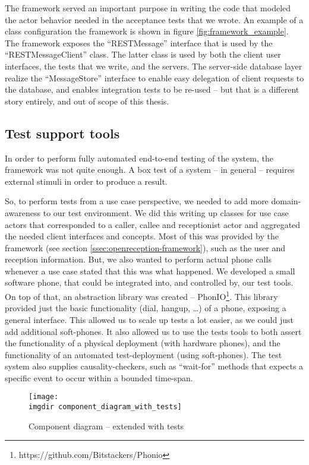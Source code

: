 \noindent The framework served an important purpose in writing the code that modeled the actor behavior needed in the acceptance tests that we wrote. An example of a class configuration the framework is shown in figure \ref{fig:framework_example}. The framework exposes the ``RESTMessage'' interface that is used by the ``RESTMessageClient'' class. The latter class is used by both the client user interfaces, the tests that we write, and the servers. The server-side database layer realize the ``MessageStore'' interface to enable easy delegation of client requests to the database, and enables integration tests to be re-used -- but that is a different story entirely, and out of scope of this thesis.

\subsection{Test support tools}
\label{ssec:supporting-test-tools}
In order to perform fully automated end-to-end testing of the system, the framework was not quite enough. A box test of a system -- in general -- requires external stimuli in order to produce a result.\medskip

\noindent So, to perform tests from a use case perspective, we needed to add more domain-awareness to our test environment. We did this writing up classes for use case actors that corresponded to a caller, callee and receptionist actor and aggregated the needed client interfaces and concepts. Most of this was provided by the framework (see section \ref{ssec:openreception-framework}), such as the user and reception information. But, we also wanted to perform actual phone calls whenever a use case stated that this was what happened. We developed a small software phone, that could be integrated into, and controlled by, our test tools. On top of that, an abstraction library was created -- PhonIO\footnote{https://github.com/Bitstackers/Phonio}. This library provided just the basic functionality (dial, hangup, \dots) of a phone, exposing a general interface. This allowed us to scale up tests a lot easier, as we could just add additional soft-phones. It also allowed us to use the tests tools to both assert the functionality of a physical deployment (with hardware phones), and the functionality of an automated test-deployment (using soft-phones). The test system also supplies causality-checkers, such as ``wait-for'' methods that expects a specific event to occur within a bounded time-span.\medskip

\begin{figure}[!htbp]
\centering
\texttt{[image: \\imgdir component\_diagram\_with\_tests]}
\caption{Component diagram -- extended with tests}
\label{fig:component_diagram_with_tests}
\end{figure}

